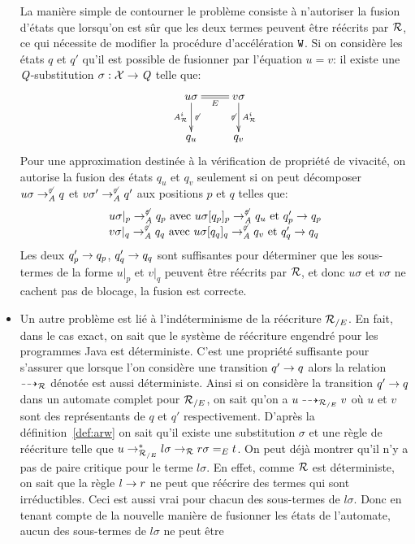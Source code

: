 \begin{itemize}
  La manière simple de contourner le problème consiste à n'autoriser la fusion d'états que lorsqu'on est
  sûr que les deux termes peuvent être réécrits par $\mathcal R$, ce qui nécessite de modifier la procédure d'accélération
  $\mathtt{W}$. Si on considère les états $q$ et $q'$ qu'il est possible
  de fusionner par l'équation $u = v$:
  il existe une $\mathit Q$-substitution $\sigma : \mathcal X \rightarrow\mathit Q$ telle que:
   \[\xymatrix{
     u\sigma \ar@{=}[r]_{E}\ar[d]_{\aaex^i}^{\not\varepsilon} & v\sigma \ar[d]_{\not\varepsilon}^{\aaex^i}\\
     q_u & q_v
   } \]
   Pour une approximation destinée à la vérification de propriété de vivacité, on autorise la fusion
   des états $q_u$ et $q_v$ seulement si on peut décomposer
   $u\sigma \rightarrow^{\not\varepsilon}_\mathit A q$ et $v\sigma' \rightarrow^{\not\varepsilon}_\mathit A q'$ aux positions $p$ et $q$ telles que:
   \[\begin{array}{l}
     u\sigma|_p \rightarrow^{\not\varepsilon}_\mathit A q_p \textrm{ avec } u\sigma[q_p]_p \rightarrow^{\not\varepsilon}_\mathit A q_u \textrm{ et } q'_p \rightarrow q_p\\ 
     v\sigma|_q \rightarrow^{\not\varepsilon}_\mathit A q_q \textrm{ avec } u\sigma[q_q]_q \rightarrow^{\not\varepsilon}_\mathit A q_v \textrm{ et } q'_q \rightarrow q_q
   \end{array}\]
   Les deux $q'_p \rightarrow q_p$, $q'_q \rightarrow q_q$ sont suffisantes pour déterminer que les sous-termes de la forme $u|_p$
   et $v|_q$ peuvent être réécrits par $\mathcal R$, et donc $u\sigma$ et $v\sigma$ ne cachent pas de blocage, la fusion
   est correcte.
 \item
   Un autre problème est lié à l'indéterminisme de la réécriture ${\mathcal R_{/E}}$. En fait, dans le cas
   exact, on sait que le système de réécriture engendré pour les programmes Java est déterministe.
   C'est une propriété suffisante pour s'assurer que lorsque l'on considère une transition $q' \rightarrow q$
   alors la relation $\dashrightarrow_{\mathcal R}$ dénotée est aussi déterministe.
   Ainsi si on considère la transition $q' \rightarrow q$ dans un automate complet pour ${\mathcal R_{/E}}$, on sait
   qu'on a $u \dashrightarrow_{{\mathcal R_{/E}}} v$ où $u$ et $v$ sont des représentants de $q$ et $q'$ respectivement.
   D'après la définition~\ref{def:arw} on sait qu'il existe une substitution $\sigma$ et une règle
   de réécriture telle que $u \rightarrow_{{\mathcal R_{/E}}}^* l\sigma \rightarrow_\mathcal R r\sigma =_E t$. On peut déjà montrer
   qu'il n'y a pas de paire critique pour le terme $l\sigma$. En effet, comme $\mathcal R$ est déterministe,
   on sait que la règle $l\rightarrow r$ ne peut que réécrire des termes qui sont irréductibles.
   Ceci est aussi vrai pour chacun des sous-termes de $l\sigma$. Donc en tenant compte de la nouvelle
   manière de fusionner les états de l'automate, aucun des sous-termes de $l\sigma$ ne peut être

\end{itemize}
